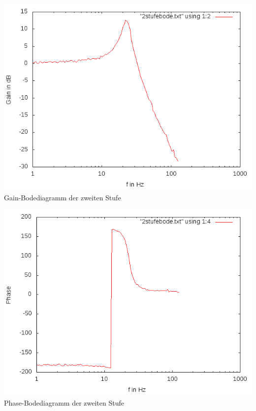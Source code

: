 \documentclass[compress,11pt]{beamer}
\begin{document}
\begin{frame}
\includegraphics[width=.7\textwidth]{4aufgabe/2stufegain}\\
Gain-Bodediagramm der zweiten Stufe
\end{frame}
\begin{frame}
\includegraphics[width=.7\textwidth]{4aufgabe/2stufephase}\\
Phase-Bodediagramm der zweiten Stufe
\end{frame}
\end{document}
